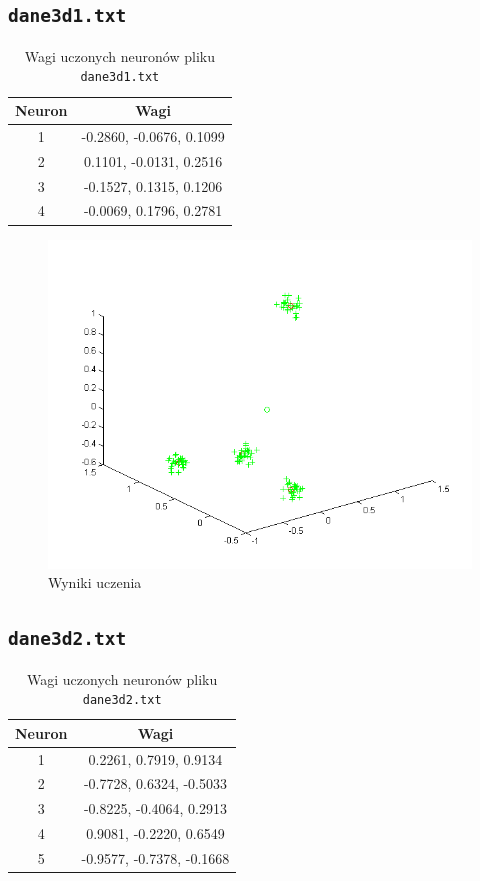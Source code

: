 \documentclass[pointlessnumbers, abstracton, headsepline, a4paper]{scrartcl}
\begin{document}
\clearpage
\subsection{\texttt{dane3d1.txt}}

\begin{table}[h]
\centering
\begin{tabular}[t]{c|c}
Neuron & Wagi \\
\hline
1& -0.2860,  -0.0676,   0.1099 \\
2&  0.1101,  -0.0131,   0.2516 \\
3& -0.1527,   0.1315,   0.1206 \\
4& -0.0069,   0.1796,   0.2781 \\
\end{tabular}
\caption{\label{tab:xor}Wagi uczonych neuronów pliku \texttt{dane3d1.txt}}
\end{table}

\begin{figure}[!h]
\centering
\includegraphics[scale=0.8]{src/dane3d1.png}\caption{\label{fig:dane1}Wyniki uczenia}
\end{figure}

\clearpage
\subsection{\texttt{dane3d2.txt}}

\begin{table}[h]
\centering
\begin{tabular}[t]{c|c}
Neuron & Wagi \\
\hline
1&  0.2261,   0.7919,   0.9134 \\
2& -0.7728,   0.6324,  -0.5033 \\
3& -0.8225,  -0.4064,   0.2913 \\
4&  0.9081,  -0.2220,   0.6549 \\
5& -0.9577,  -0.7378,  -0.1668 \\
\end{tabular}
\caption{\label{tab:xor}Wagi uczonych neuronów pliku \texttt{dane3d2.txt}}
\end{table}
\end{document}
